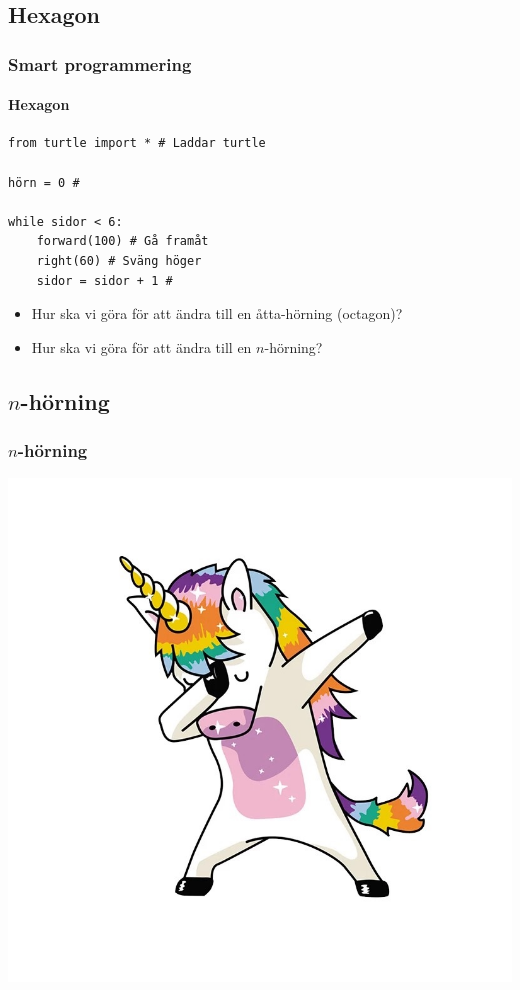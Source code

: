 \documentclass[aspectratio=169]{beamer}
\begin{document}
\subsection{Hexagon}

\begin{frame}[fragile]
	\frametitle{Smart programmering}
	\framesubtitle{Hexagon}
	
	\begin{lstlisting}
from turtle import * # Laddar turtle

hörn = 0 # 

while sidor < 6: 
    forward(100) # Gå framåt
    right(60) # Sväng höger
    sidor = sidor + 1 #
	\end{lstlisting}
	
	\begin{itemize}
		\item Hur ska vi göra för att ändra till en åtta-hörning (octagon)?
		\item Hur ska vi göra för att ändra till en \(n\)-hörning?
	\end{itemize}

\end{frame}

\subsection{\(n\)-hörning}

\begin{frame}[fragile]
	\frametitle{\(n\)-hörning}
	
	\begin{center}
	\includegraphics[width=.5\textwidth]{unicorn.jpg}
	\end{center}
	
\end{frame}
\end{document}
